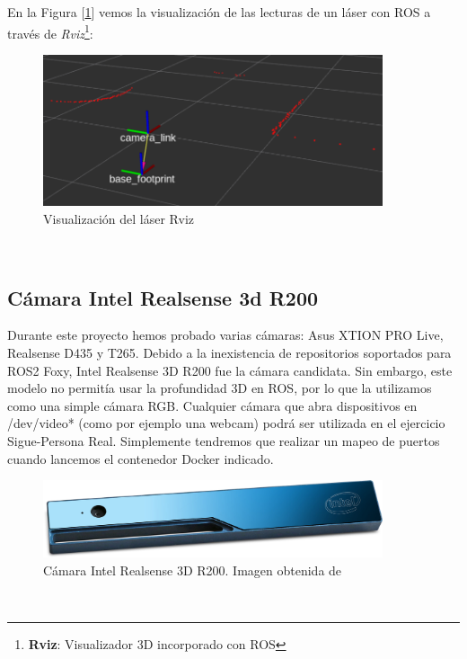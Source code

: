 En la Figura [\ref{fig:laser_rviz}] vemos la visualización de las lecturas de un láser con ROS a través de \textit{Rviz}\footnote{\textbf{Rviz}: Visualizador 3D incorporado con ROS}:\\

\begin{figure} [H]
  \begin{center}
    \includegraphics[width=10cm]{imagenes/cap3/laser-rviz.png}
  \end{center}
  \caption[Visualización del láser en Rviz]{Visualización del láser Rviz}
  \label{fig:laser_rviz}
\end{figure}\


\subsection{Cámara Intel Realsense 3d R200}
\label{subsec:turtlebot2_intel_realsense_3d}

Durante este proyecto hemos probado varias cámaras: Asus XTION PRO Live, Realsense D435 y T265. Debido a la inexistencia de repositorios soportados para ROS2 Foxy, Intel Realsense 3D R200 fue la cámara candidata. Sin embargo, este modelo no permitía usar la profundidad 3D en ROS, por lo que la utilizamos como una simple cámara RGB. Cualquier cámara que abra dispositivos en /dev/video* (como por ejemplo una webcam) podrá ser utilizada en el ejercicio Sigue-Persona Real. Simplemente tendremos que realizar un mapeo de puertos cuando lancemos el contenedor Docker indicado.\\

\begin{figure} [H]
  \begin{center}
    \includegraphics[width=10cm]{imagenes/cap3/r200.jpg}
  \end{center}
  \caption[Cámara Intel Realsense 3D R200]{Cámara Intel Realsense 3D R200. Imagen obtenida de \cite{R200}}
  \label{fig:camara_r200}
\end{figure}\

